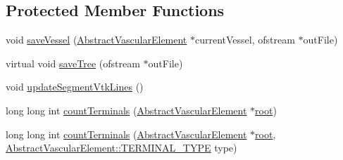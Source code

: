 \subsection*{Protected Member Functions}
\begin{DoxyCompactItemize}
\item 
void \hyperlink{class_abstract_object_c_c_o_tree_a0bcc6af551702ca4054682acc02d1566}{save\+Vessel} (\hyperlink{class_abstract_vascular_element}{Abstract\+Vascular\+Element} $\ast$current\+Vessel, ofstream $\ast$out\+File)
\item 
virtual void \hyperlink{class_abstract_object_c_c_o_tree_a401ce5c8e425dae5a8d72bdd007a3464}{save\+Tree} (ofstream $\ast$out\+File)
\item 
void \hyperlink{class_abstract_object_c_c_o_tree_ad91b5a57a3fb2593a705d50648769639}{update\+Segment\+Vtk\+Lines} ()
\item 
long long int \hyperlink{class_abstract_object_c_c_o_tree_ae7874b2b981525686500f1c6b23548b4}{count\+Terminals} (\hyperlink{class_abstract_vascular_element}{Abstract\+Vascular\+Element} $\ast$\hyperlink{class_abstract_object_c_c_o_tree_ae1b17938ad34d92629915159c49bb89a}{root})
\item 
long long int \hyperlink{class_abstract_object_c_c_o_tree_a7a3f13ee2c446f71d2f826f259c2fd7d}{count\+Terminals} (\hyperlink{class_abstract_vascular_element}{Abstract\+Vascular\+Element} $\ast$\hyperlink{class_abstract_object_c_c_o_tree_ae1b17938ad34d92629915159c49bb89a}{root}, \hyperlink{class_abstract_vascular_element_a9c7d6ae9fe8c220ddad143208b0a5a11}{Abstract\+Vascular\+Element\+::\+T\+E\+R\+M\+I\+N\+A\+L\+\_\+\+T\+Y\+PE} type)
\end{DoxyCompactItemize}
